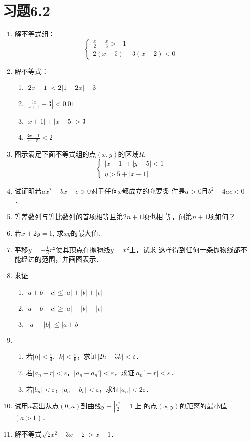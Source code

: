 \section*{习题6.2}

\begin{enumerate}
    \item 解不等式组：
\[\begin{cases}
    \frac{x}{2}-\frac{x}{3}>-1\\
    2(x-3)-3(x-2)<0
\end{cases}\]

\item 解不等式：
\begin{multicols}{2}
\begin{enumerate}
    \item $|2x-1|<2|1-2x|-3$
    \item $\left|\frac{3x}{x+1}-3\right|<0.01$
    \item $|x+1|+|x-5|>3$
    \item $\frac{3x-1}{x-5}<2$
\end{enumerate}
\end{multicols}

\item 图示满足下面不等式组的点$(x,y)$的区域$R$.
\[\begin{cases}
    |x-1|+|y-5|<1\\
y>5+|x-1|
\end{cases}\]
\item 试证明若$ax^2+bx+c>0$对于任何$x$都成立的充要条
件是$a>0$且$b^2-4ac<0$．
\item 等差数列与等比数列的首项相等且第$2n+1$项也相
等，问第$n+1$项如何？
\item 若$x+2y=1$, 求$xy$的最大值．
\item 平移$y=-\frac{1}{3}x^2$使其顶点在抛物线$y=x^2$上，试求
这样得到任何一条抛物线都不能经过的范围，并画图表示．
\item 求证
\begin{enumerate}
    \item $|a+b+c|\le |a|+|b|+|c|$
    \item $|a-b-c|\ge |a|-|b|-|c|$
    \item $\Big| |a|-|b| \Big|\le |a+b|$
\end{enumerate}

\item \begin{enumerate}
    \item 若$|h|<\frac{\varepsilon}{4}$, $|k|<\frac{\varepsilon}{6}$，求证$|2h-3k|<\varepsilon$．
    \item 若$|a_n-r|<\varepsilon$，$|a_n-a_n'|<\varepsilon$，求证$|a_n'-r|<\varepsilon$．
    \item 若$|b_n|<\varepsilon$，$|a_n-b_n|<\varepsilon$，求证$|a_n|<2\varepsilon$．
\end{enumerate}

\item 试用$a$表出从点$(0,a)$到曲线$y=\left|\frac{x^2}{2}-1\right|$上
的点$(x,y)$的距离的最小值$(a>1)$．

\item 解不等式$\sqrt{2x^2-3x-2}>x-1$．
\end{enumerate}

